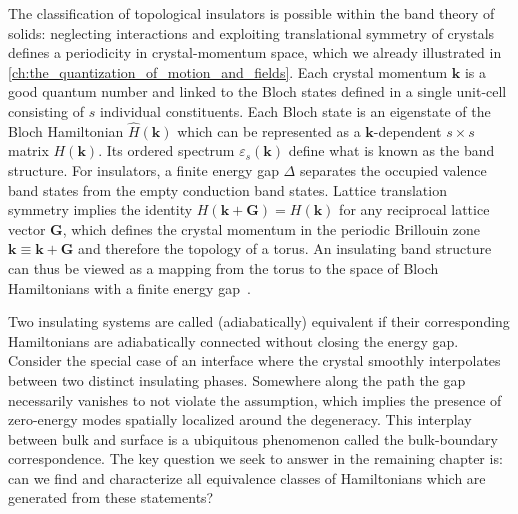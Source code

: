 The classification of topological insulators is possible within the band theory of solids: neglecting interactions and exploiting translational symmetry of crystals defines a periodicity in crystal-momentum space, which we already illustrated in \cref{ch:the_quantization_of_motion_and_fields}.
Each crystal momentum ${\bm k}$ is a good quantum number and linked to the Bloch states defined in a single unit-cell consisting of $s$ individual constituents.
Each Bloch state is an eigenstate of the Bloch Hamiltonian $\hat H(\bm k)$ which can be represented as a $\bm k$-dependent $s\times s$ matrix $H(\bm k)$.
Its ordered spectrum $\varepsilon_s(\bm k)$ define what is known as the band structure.
For insulators, a finite energy gap $\Delta$ separates the occupied valence band states from the empty conduction band states.
Lattice translation symmetry implies the identity $H(\bm k + \bm G) = H(\bm k)$ for any reciprocal lattice vector $\bm G$, which defines the crystal momentum in the periodic Brillouin zone $\bm k\equiv \bm k+\bm G$ and therefore the topology of a torus.
An insulating band structure can thus be viewed as a mapping from the torus to the space of Bloch Hamiltonians with a finite energy gap~\cite{Kane2013}.

Two insulating systems are called (adiabatically) equivalent if their corresponding Hamiltonians are adiabatically connected without closing the energy gap.
Consider the special case of an interface where the crystal smoothly interpolates between two distinct insulating phases.
Somewhere along the path the gap necessarily vanishes to not violate the assumption, which implies the presence of zero-energy modes spatially localized around the degeneracy.
This interplay between bulk and surface is a ubiquitous phenomenon called the bulk-boundary correspondence.
The key question we seek to answer in the remaining chapter is: can we find and characterize all equivalence classes of Hamiltonians which are generated from these statements?

